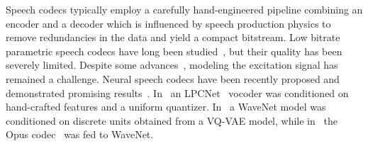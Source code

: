 {}
Speech codecs typically employ a carefully hand-engineered pipeline combining an encoder and a decoder 
which is influenced by speech production physics
to remove redundancies in the data and yield a compact bitstream. Low bitrate parametric speech codecs have long been studied~\cite{atal1971speech}, but their quality has been severely limited. Despite some advances~\cite{griffin1985new, mccree19962}, modeling the excitation signal has remained a challenge. Neural speech codecs have been recently proposed and demonstrated promising results~\cite{kleijn2018wavenet, lim2020robust}. 
In~\cite{valin2019real} an LPCNet~\cite{valin2019lpcnet} vocoder was conditioned on hand-crafted features and a uniform quantizer. In~\cite{garbacea2019low} a WaveNet model was conditioned on discrete units obtained from a VQ-VAE model, while in~\cite{skoglund2019improving} the Opus codec~\cite{valin2012definition} was fed to WaveNet. %